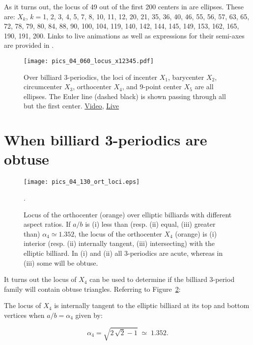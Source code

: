 As it turns out, the locus of 49 out of the first 200 centers in \cite{etc} are ellipses. These are: $X_k$, $k=$1,  2,  3,  4,  5,  7,  8,  10,  11,  12,  20,  21,  35,  36,  40,  46,  55,  56,  57,  63,  65,  72,  78,  79,  80,  84,  88,  90,  100,  104,  119,  140,  142,  144,  145,  149,  153,  162,  165,  190,  191,  200. Links to live animations as well as expressions for their semi-axes are provided in \cite{garcia2021-ellipses-web}.


\begin{figure}
\centering
\texttt{[image: pics\_04\_060\_locus\_x12345.pdf]}
\caption{Over billiard 3-periodics, the loci of incenter $X_1$, barycenter $X_2$, circumcenter $X_3$, orthocenter $X_4$, and 9-point center $X_5$ are all ellipses. The Euler line (dashed black) is shown passing through all but the first center. \href{https://youtu.be/sMcNzcYaqtg}{Video}, \href{https://bit.ly/3eVScgE}{Live}}
\label{fig:04-x12345}
\end{figure}

\section{When billiard 3-periodics are obtuse}

\begin{figure}
    \centering
    \texttt{[image: pics\_04\_130\_ort\_loci.eps]}
    \caption{Locus of the orthocenter (orange) over elliptic billiards with different aspect ratios. If $a/b$ is (i) less than (resp. (ii) equal, (iii) greater than) $\alpha_4{\simeq}1.352$, the locus of the orthocenter $X_4$ (orange) is (i) interior (resp. (ii) internally tangent, (iii) intersecting) with the elliptic billiard. In (i) and (ii) all 3-periodics are acute, whereas in (iii) some will be obtuse.}.
    \label{fig:04-orthocenter-loci}
\end{figure}

It turns out the locus of $X_4$ can be used to determine if the billiard 3-period family will contain obtuse triangles. Referring to Figure~\ref{fig:04-orthocenter-loci}:

\begin{proposition}
The locus of $X_4$ is internally tangent to the elliptic billiard at its top and bottom vertices when $a/b=\alpha_4$ given by:

\[\alpha_4 = \sqrt{2\,\sqrt {2}-1}\;{\simeq}\;1.352.\]
\label{prop:04-alpha4}
\end{proposition}

